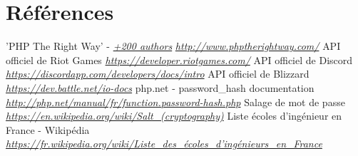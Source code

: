 \documentclass[10pt]{article}
\begin{document}
  \newpage
  \section{Références}
  \begin{thebibliography}{}
    
    \label{phpgoodpratices}
    'PHP The Right Way' - \href{https://github.com/codeguy/php-the-right-way/graphs/contributors}{\textit{+200 authors}} \newline
    \href{http://www.phptherightway.com/}{\textit{http://www.phptherightway.com/}}
    \newline
    \newline
    \label{riotapi}
    API officiel de Riot Games \newline
    \href{https://developer.riotgames.com/}{\textit{https://developer.riotgames.com/}}
    \newline
    \newline
    \label{discordapi}
    API officiel de Discord \newline
    \href{https://discordapp.com/developers/docs/intro}{\textit{https://discordapp.com/developers/docs/intro}}
    \newline
    \newline
    \label{blizzardapi}
    API officiel de Blizzard \newline
    \href{https://dev.battle.net/io-docs}{\textit{https://dev.battle.net/io-docs}}
    \newline
    \newline
    \label{password_hash}
    php.net - password\_hash documentation \newline
    \href{http://php.net/manual/fr/function.password-hash.php}{\textit{http://php.net/manual/fr/function.password-hash.php}}
    \newline
    \newline
    \label{password_salt}
    Salage de mot de passe \newline
    \href{https://en.wikipedia.org/wiki/Salt_(cryptography)}{\textit{https://en.wikipedia.org/wiki/Salt\_(cryptography)}}
    \newline
    \newline
    \label{ecole_ingé}
    Liste écoles d'ingénieur en France - Wikipédia \newline
    \href{https://fr.wikipedia.org/wiki/Liste_des_écoles_d'ingénieurs_en_France#Liste_des_207_écoles_françaises_accréditées_au_1er_septembre_2017}{\textit{https://fr.wikipedia.org/wiki/Liste\_des\_écoles\_d'ingénieurs\_en\_France}}

\end{thebibliography}
\end{document}

